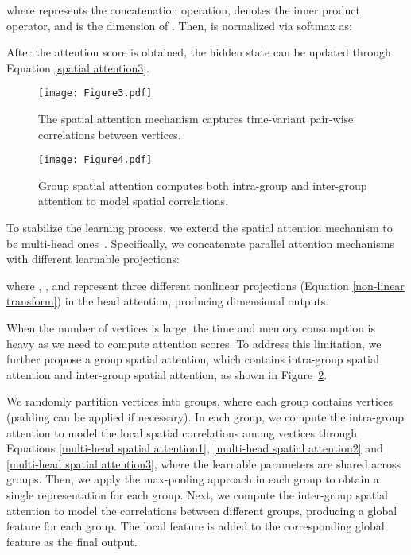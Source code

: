 \documentclass[letterpaper]{article} \usepackage{aaai20}  \usepackage{times}  \usepackage{helvet} \usepackage{courier}  \usepackage[hyphens]{url}  \usepackage{graphicx} \usepackage{amsmath}
\begin{document}
where  represents the concatenation operation,  denotes the inner product operator, and  is the dimension of . Then,  is normalized via softmax as:

After the attention score  is obtained, the hidden state can be updated through Equation \ref{spatial attention3}.

\begin{figure}
	\centering
	\texttt{[image: Figure3.pdf]} \\
	\caption{The spatial attention mechanism captures time-variant pair-wise correlations between vertices.}
	\label{Figure3}
\end{figure}

\begin{figure}
	\centering
	\texttt{[image: Figure4.pdf]} \\
	\caption{Group spatial attention computes both intra-group and inter-group attention to model spatial correlations.}
	\label{Figure4}
\end{figure}

To stabilize the learning process, we extend the spatial attention mechanism to be multi-head ones~\cite{Vaswani-et-al:NIPS2017}. Specifically, we concatenate  parallel attention mechanisms with different learnable projections:



where , , and  represent three different nonlinear projections (Equation \ref{non-linear transform}) in the  head attention, producing  dimensional outputs. 

When the number of vertices  is large, the time and memory consumption is heavy as we need to compute  attention scores. To address this limitation, we further propose a group spatial attention, which contains intra-group spatial attention and inter-group spatial attention, as shown in Figure~\ref{Figure4}.

We randomly partition  vertices into  groups, where each group contains  vertices (padding can be applied if necessary). In each group, we compute the intra-group attention to model the local spatial correlations among vertices through Equations \ref{multi-head spatial attention1}, \ref{multi-head spatial attention2} and \ref{multi-head spatial attention3}, where the learnable parameters are shared across groups. Then, we apply the max-pooling approach in each group to obtain a single representation for each group. Next, we compute the inter-group spatial attention to model the correlations between different groups, producing a global feature for each group. The local feature is added to the corresponding global feature as the final output.
\end{document}
